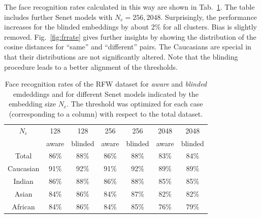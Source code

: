 \documentclass{report}
\begin{document}
\noindent The face recognition rates calculated in this way are shown in  Tab.~\ref{tab:frrate}. The table includes further Senet models with $N_e=256, 2048$. Surprisingly, the performance increases for the blinded embeddings by about 2\% for all clusters. Bias is slightly removed.  Fig.~\ref{fig:frrate} gives further insights by showing the distribution of the cosine distances for ``same'' and ``different'' pairs. The Caucasians are special in that their distributions are not significantly altered. Note that the blinding procedure leads to a better alignment of the thresholds. 


\begin{table}
\begin{center}
\begin{tabular}{ c|c|c || c|c || c|c }
$N_e$ & 128 & 128 & 256 & 256 & 2048 & 2048 \\
        & aware  & blinded  & aware  & blinded  & aware  & blinded  \\
\hline
Total & 86\% & 88\%           &  86\% & 88\%    &  83\% & 84\%  \\ 
\hline
Caucasian & 91\% & 92\%    &  91\% & 92\%    &  89\% & 89\% \\  
Indian & 86\% & 88\%          &  86\% & 88\%    &  85\% & 85\%\\ 
Asian & 84\% & 86\%           &  84\% & 87\%    &  82\% & 82\%\\ 
African & 84\% &    86\%      &  84\% & 85\%    &  76\% & 79\% 
\end{tabular}
\end{center}
\caption{Face recognition rates of the RFW dataset for \emph{aware}  and  \emph{blinded} emdeddings and for different Senet models indicated by the embedding size $N_e$. The threshold was optimized for each case (corresponding to a column) with respect to the total dataset.}
\label{tab:frrate}
\end{table}
\end{document}
